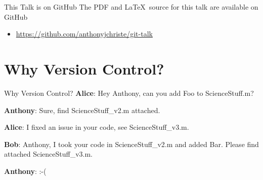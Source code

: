 \documentclass{beamer}
\begin{document}
    \begin{frame}{This Talk is on GitHub}
        The PDF and \LaTeX~source for this talk are available on GitHub
        \begin{itemize}
            \item \url{https://github.com/anthonyjchriste/git-talk}
        \end{itemize}
    \end{frame}


    \section{Why Version Control?}\label{sec:why-version-control?}
    \begin{frame}{Why Version Control?}
        \textbf{Alice}: Hey Anthony, can you add Foo to ScienceStuff.m?

        \textbf{Anthony}: Sure, find ScienceStuff\_v2.m attached.

        \textbf{Alice}: I fixed an issue in your code, see ScienceStuff\_v3.m.

        \textbf{Bob}: Anthony, I took your code in ScienceStuff\_v2.m and added Bar. Please find attached ScienceStuff\_v3.m.

        \textbf{Anthony}: :-(
    \end{frame}
\end{document}
